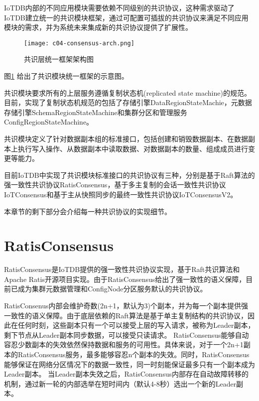 IoTDB内部的不同应用模块需要依赖不同级别的共识协议，这种需求驱动了IoTDB建立统一的共识模块框架，通过可配置可插拔的共识协议来满足不同应用模块的需求，并为系统未来集成新的共识协议提供了扩展性。

\begin{figure}
    \centering
    \texttt{[image: c04-consensus-arch.png]}
    \caption{共识层统一框架架构图}
    \label{fig:c04-consensus-arch}
  \end{figure}
  
图\ref{fig:c04-consensus-arch} 给出了共识模块统一框架的示意图。

共识模块要求所有的上层服务遵循复制状态机(replicated state machine)\cite{lamport1978statemachine}的规范。目前，实现了复制状态机规范的包括了存储引擎DataRegionStateMachie，元数据存储引擎SchemaRegionStateMachine和集群分区和管理服务ConfigRegionStateMachine。

共识模块定义了针对数据副本组的标准接口，包括创建和销毁数据副本、在数据副本上执行写入操作、从数据副本中读取数据、对数据副本的数量、组成成员进行变更等能力。

目前IoTDB中实现了共识模块标准接口的共识协议有三种，分别是基于Raft算法的强一致性共识协议RatisConsensus，基于多主复制的会话一致性共识协议IoTConsensus和基于主从快照同步的最终一致性共识协议IoTConsensusV2。

本章节的剩下部分会介绍每一种共识协议的实现细节。


\section{RatisConsensus}

RatisConsensus是IoTDB提供的强一致性共识协议实现，基于Raft共识算法和Apache Ratis\cite{ratis}开源项目实现。由于RatisConsensus给出了强一致性的语义保障，目前已成为集群元数据管理和ConfigNode分区服务默认的共识协议。

RatisConsenus内部会维护奇数(2n+1，默认为3)个副本，并为每一个副本提供强一致性的语义保障。由于底层依赖的Raft算法是基于单主复制结构的共识协议，因此在任何时刻，这些副本只有一个可以接受上层的写入请求，被称为Leader副本，剩下节点从Leader副本同步数据，可以接受只读请求。
RatisConsensus能够自动容忍少数副本的失效依然保持数据和服务的可用性。具体来说，对于一个2n+1副本的RatisConsensus服务，最多能够容忍n个副本的失效。同时，RatisConsensus能够保证在网络分区情况下的数据一致性，同一时刻能保证最多只有一个副本成为Leader副本。
当Leader副本失效之后，RatisConsensus内部存在自动故障转移的机制，通过新一轮的内部选举在短时间内（默认4-8秒）选出一个新的Leader副本。


